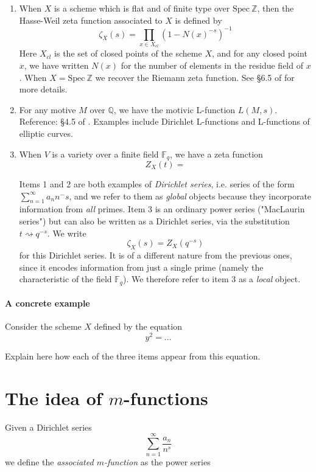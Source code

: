 \documentclass[paper=a4, fontsize=11pt]{scrartcl} %
\numberwithin{equation}{section} %
\numberwithin{figure}{section} %
\numberwithin{table}{section} %
\begin{document}
\begin{enumerate}

\item When $X$ is a scheme which is flat and of finite type over $\mathrm{Spec} \ \mathbb{Z}$, then the Hasse-Weil zeta function associated to $X$ is defined by
$$ \zeta_X(s) = \prod_{x \in X_{cl}} \left( 1 - N(x)^{-s}   \right)^{-1}  $$
Here $X_{cl}$ is the set of closed points of the scheme $X$, and for any closed point $x$, we have written $N(x)$ for the number of elements in the residue field of $x$. When $X = \mathrm{Spec} \ \mathbb{Z}$ we recover the Riemann zeta function. See \S 6.5 of \cite{Mustata} for more details.
\item For any motive $M$ over $\mathbb{Q}$, we have the motivic L-function $L(M, s)$. Reference: \S 4.5 of \cite{Farmer17}. Examples include Dirichlet L-functions and L-functions of elliptic curves.
\item When $V$ is a variety over a finite field $\mathbb{F}_q$, we have a zeta function
$$  Z_X(t) =   $$


Items 1 and 2 are both examples of \emph{Dirichlet series}, i.e. series of the form $\sum_{n=1}^{\infty} a_n n^-s$, and we refer to them as \emph{global} objects because they incorporate information from \emph{all} primes. Item 3 is an ordinary power series ("MacLaurin series") but can also be written as a Dirichlet series, via the substitution $t \rightsquigarrow q^{-s}$. We write
$$ \zeta_X(s) = Z_X(q^{-s})  $$
for this Dirichlet series. It is of a different nature from the previous ones, since it encodes information from just a single prime (namely the characteristic of the field $\mathbb{F}_q$). We therefore refer to item 3 as a \emph{local} object.

\end{enumerate}

\paragraph{A concrete example} Consider the scheme $X$ defined by the equation
$$  y^2 = \ldots $$

Explain here how each of the three items appear from this equation.

\section{The idea of $m$-functions}

Given a Dirichlet series
$$   \sum_{n = 1}^{\infty}  \frac{a_n}{n^s}   $$
we define the \emph{associated $m$-function} as the power series
\end{document}
